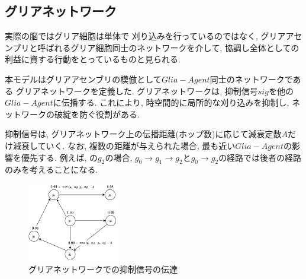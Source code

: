 \documentclass[a4paper,9pt,twocolumn]{jsarticle}
\begin{document}
\subsection{グリアネットワーク}
実際の脳ではグリア細胞は単体で
刈り込みを行っているのではなく, 
グリアアセンブリと呼ばれるグリア細胞同士のネットワークを介して, 
協調し全体としての利益に資する行動をとっているものと見られる.

本モデルはグリアアセンブリの模倣として$Glia-Agent$同士のネットワークである
グリアネットワークを定義した.
グリアネットワークは, 抑制信号$sig$を他の$Glia-Agent$に伝播する.
これにより, 時空間的に局所的な刈り込みを抑制し, ネットワークの破綻を防ぐ役割がある.

抑制信号は, グリアネットワーク上の伝播距離(ホップ数)に応じて減衰定数$A$だけ減衰していく.
なお, 複数の距離が与えられた場合, 最も近い$Glia-Agent$の影響を優先する.
例えば, の$g_2$の場合, 
$g_0\rightarrow g_1\rightarrow g_2$と$g_0\rightarrow g_2$の経路では後者の経路のみを考えることになる.
\begin{figure}[H]
  \centering
  \includegraphics[width=4cm]{GliaNetworks.pdf}
  \caption{グリアネットワークでの抑制信号の伝達}
  \label{fig:GliaNetworks}
\end{figure}
\vspace{-3zh}
\end{document}
